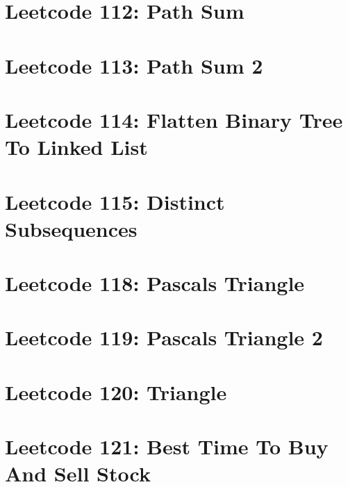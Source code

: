 \documentclass{article}
\begin{document}
\section*{Leetcode 112: Path Sum}

\pagebreak 

\section*{Leetcode 113: Path Sum 2}

\pagebreak 

\section*{Leetcode 114: Flatten Binary Tree To Linked List}

\pagebreak 

\section*{Leetcode 115: Distinct Subsequences}

\pagebreak 

\section*{Leetcode 118: Pascals Triangle}

\pagebreak 

\section*{Leetcode 119: Pascals Triangle 2}

\pagebreak 

\section*{Leetcode 120: Triangle}

\pagebreak 

\section*{Leetcode 121: Best Time To Buy And Sell Stock}

\pagebreak 
\end{document}
